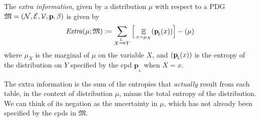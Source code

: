 \documentclass{article}
\theoremstyle{plain}
\theoremstyle{definition}
\theoremstyle{remark}
\let\H\relax
\DeclareMathOperator{\H}{\mathrm{H}} %
\DeclareMathOperator*{\E}{\mathbb{E}} %
\newcommand\mat[1]{\mathbf{#1}}
\newcommand{\bp}[1][L]{\mat{p}_{\!_{#1}\!}}
\newcommand{\Ed}{\mathcal E}
\newcommand{\dg}[1]{\mathfrak{#1}}
\newcommand\extrsymb{\mathit{Extra}}
\newcommand\extrainfo[2][\dg M]{\extrsymb(#2;#1)}
\newcommand{\ed}[3]{#2 \xrightarrow{\!\!\smash{#1}\vphantom{g}} #3}
\newcommand{\alle}[1][L]{_{ \ed {#1}XY}}
\numberwithin{equation}{section}
\begin{document}
	\begin{defn}\label{def:extra}
		The \emph{extra information}, given by a distribution $\mu$ 
		with respect to a PDG $\dg M = \mnvars[]$ 
		is given by
		\[ \extrainfo\mu := \sum\alle \Big[ \E_{x
                \sim \mu_X}  \H (\bp (x))  \Big] - \H(\mu) \]  
		where $\mu_X$ is the marginal of $\mu$ on the variable
                $X$, and $\H(\bp(x))$ is the entropy of the
                distribution on $Y$ specified by the cpd $\bp$ when $X
                = x$.
	\end{defn}
	The extra information is the sum of the entropies that
        \emph{actually} result from each table, in the context of
        distribution $\mu$, minus the total entropy of the
        distribution. 
	We can think of
		its negation
		as the uncertainty in $\mu$,
        which has not already been specified by the cpds in $\dg M$.

\end{document}
